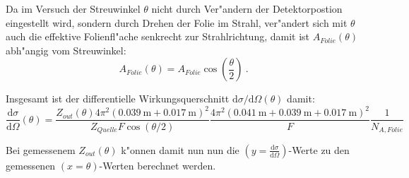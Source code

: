     Da im Versuch der Streuwinkel $\theta$ nicht durch Ver"andern der Detektorpostion eingestellt wird, sondern durch Drehen der Folie im Strahl, ver"andert sich mit $\theta$ auch die effektive Folienfl"ache senkrecht zur Strahlrichtung, damit ist $A_{Folie}(\theta)$ abh"angig vom Streuwinkel:
    \begin{equation}
      A_{Folie}(\theta) = A_{Folie}\cos\left(\frac{\theta}{2}\right) \:.
    \end{equation}

    Insgesamt ist der differentielle Wirkungsquerschnitt $\text{d}\sigma/\text{d}\Omega(\theta)$ damit:
    \begin{equation}
      \frac{\text{d}\sigma}{\text{d}\Omega}(\theta) =  \frac{Z_{out}(\theta)4\pi^2(\SI{0,039}{\meter}+\SI{0,017}{\meter})^2}{Z_{Quelle}F\cos(\theta/2)}
      \frac{4\pi^2 (\SI{0,041}{\meter}+\SI{0,039}{\meter}+\SI{0.017}{\meter})^2}{F}\frac{1}{N_{A,Folie}}
      \label{querschnitt}
    \end{equation}

    Bei gemessenem $Z_{out}(\theta)$ k"onnen damit nun nun die $(y=\frac{\text{d}\sigma}{\text{d}\Omega})$-Werte zu den gemessenen $(x=\theta)$-Werten berechnet werden.
